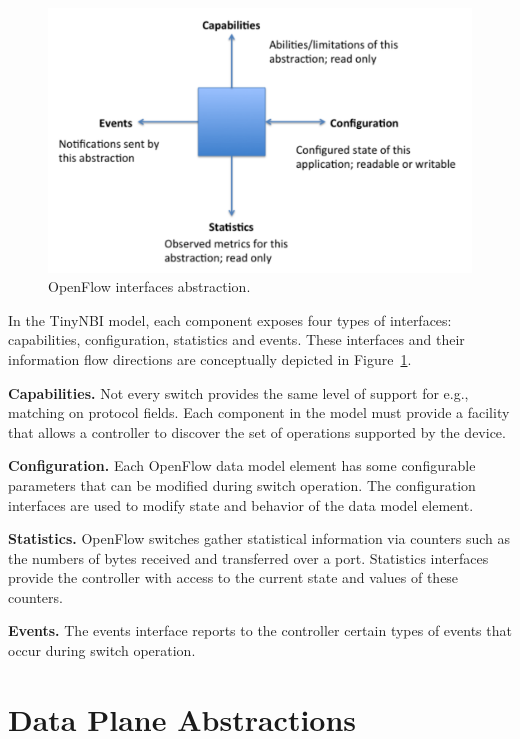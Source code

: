 \begin{figure}[t]
  \centering
  \includegraphics[scale=0.64]{figures/abstraction.pdf}
  \caption{OpenFlow interfaces abstraction.}
  \label{fig:abstraction}
\end{figure}

In the TinyNBI model, each component exposes four types of interfaces:
capabilities, configuration, statistics and events.  These interfaces and their
information flow directions are conceptually depicted in
Figure~\ref{fig:abstraction}.

\textbf{Capabilities.} Not every switch provides the same level of
support for e.g., matching on protocol fields. Each component in the
model must provide a facility that allows a controller to discover the
set of operations supported by the device.

\textbf{Configuration.} Each OpenFlow data model element has some
configurable parameters that can be modified during switch operation.
The configuration interfaces are used to modify state and behavior of the data
model element. 

\textbf{Statistics.}  OpenFlow switches gather statistical information
via counters such as the numbers of bytes received and transferred over a
port. Statistics interfaces provide the controller with access to the current
state and values of these counters. 

\textbf{Events.} The events interface reports to the controller certain
types of events that occur during switch operation. 



\section{\aetherflow Data Plane Abstractions}



